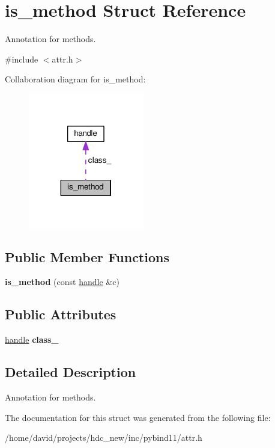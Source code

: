 \hypertarget{structis__method}{}\section{is\+\_\+method Struct Reference}
\label{structis__method}


Annotation for methods.  




{\ttfamily \#include $<$attr.\+h$>$}



Collaboration diagram for is\+\_\+method\+:
\nopagebreak
\begin{figure}[H]
\begin{center}
\leavevmode
\includegraphics[width=143pt]{structis__method__coll__graph}
\end{center}
\end{figure}
\subsection*{Public Member Functions}
\begin{DoxyCompactItemize}
\item 
{\bfseries is\+\_\+method} (const \hyperlink{classhandle}{handle} \&c)\hypertarget{structis__method_a485eb88610e6850e945058bab969ea75}{}\label{structis__method_a485eb88610e6850e945058bab969ea75}

\end{DoxyCompactItemize}
\subsection*{Public Attributes}
\begin{DoxyCompactItemize}
\item 
\hyperlink{classhandle}{handle} {\bfseries class\+\_\+}\hypertarget{structis__method_afc73c1a3bd92b1dc49872a16bdeeba0c}{}\label{structis__method_afc73c1a3bd92b1dc49872a16bdeeba0c}

\end{DoxyCompactItemize}


\subsection{Detailed Description}
Annotation for methods. 

The documentation for this struct was generated from the following file\+:\begin{DoxyCompactItemize}
\item 
/home/david/projects/hdc\+\_\+new/inc/pybind11/attr.\+h\end{DoxyCompactItemize}
